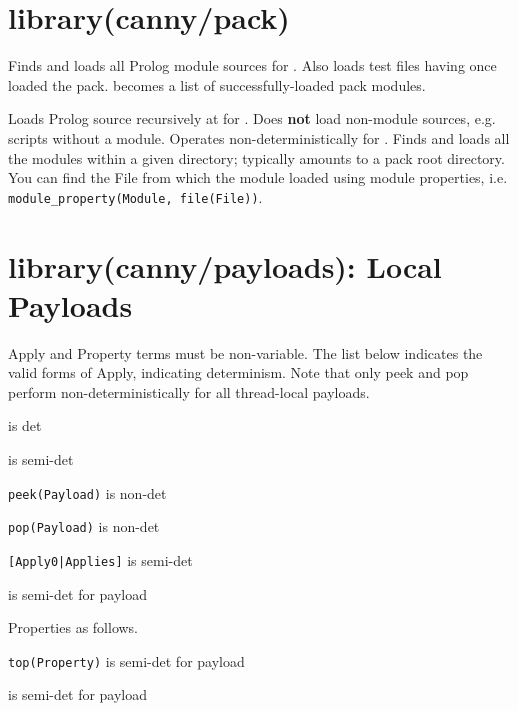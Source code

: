 \chapter{library(canny/pack)}\label{sec:pack}

\begin{description}
Finds and loads all Prolog module sources for . Also loads test
files having once loaded the pack.  becomes a list of
successfully-loaded pack modules.

Loads Prolog source recursively at  for . Does \textbf{not}
load non-module sources, e.g. scripts without a module. Operates
non-deterministically for . Finds and loads all the modules
within a given directory; typically amounts to a pack root
directory. You can find the File from which the module loaded using
module properties, i.e. \verb$module_property(Module, file(File))$.
\end{description}

\chapter{library(canny/payloads): Local Payloads}\label{sec:payloads}

Apply and Property terms must be non-variable. The list below
indicates the valid forms of Apply, indicating determinism. Note that
only peek and pop perform non-deterministically for all thread-local
payloads.

\begin{shortlist}
    \item {} is det
    \item {} is semi-det
    \item \verb$peek(Payload)$ is non-det
    \item \verb$pop(Payload)$ is non-det
    \item \verb$[Apply0|Applies]$ is semi-det
    \item {} is semi-det for payload
\end{shortlist}

Properties as follows.

\begin{shortlist}
    \item \verb$top(Property)$ is semi-det for payload
    \item {} is semi-det for payload
\end{shortlist}

